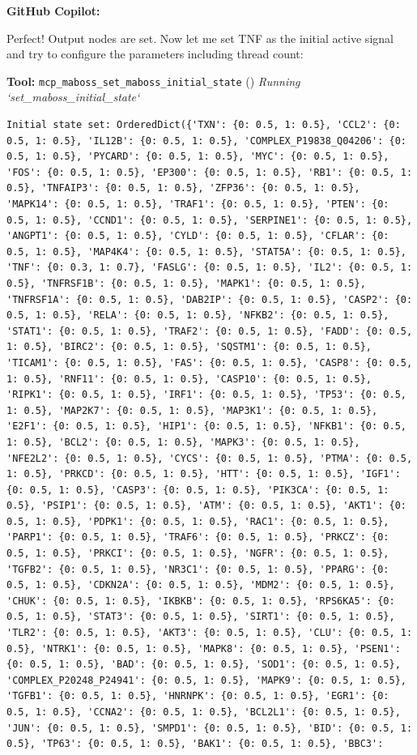 \documentclass[11pt,a4paper]{article}
\begin{document}
\begin{copilotbox}
\textbf{GitHub Copilot:}

Perfect! Output nodes are set. Now let me set TNF as the initial active signal and try to configure the parameters including thread count:

\end{copilotbox}
\begin{toolokbox}
\textbf{Tool:} \texttt{mcp\_maboss\_set\_maboss\_initial\_state} (\checkmark)
\textit{Running `set\_maboss\_initial\_state`}
\begin{lstlisting}
Initial state set: OrderedDict({'TXN': {0: 0.5, 1: 0.5}, 'CCL2': {0: 0.5, 1: 0.5}, 'IL12B': {0: 0.5, 1: 0.5}, 'COMPLEX_P19838_Q04206': {0: 0.5, 1: 0.5}, 'PYCARD': {0: 0.5, 1: 0.5}, 'MYC': {0: 0.5, 1: 0.5}, 'FOS': {0: 0.5, 1: 0.5}, 'EP300': {0: 0.5, 1: 0.5}, 'RB1': {0: 0.5, 1: 0.5}, 'TNFAIP3': {0: 0.5, 1: 0.5}, 'ZFP36': {0: 0.5, 1: 0.5}, 'MAPK14': {0: 0.5, 1: 0.5}, 'TRAF1': {0: 0.5, 1: 0.5}, 'PTEN': {0: 0.5, 1: 0.5}, 'CCND1': {0: 0.5, 1: 0.5}, 'SERPINE1': {0: 0.5, 1: 0.5}, 'ANGPT1': {0: 0.5, 1: 0.5}, 'CYLD': {0: 0.5, 1: 0.5}, 'CFLAR': {0: 0.5, 1: 0.5}, 'MAP4K4': {0: 0.5, 1: 0.5}, 'STAT5A': {0: 0.5, 1: 0.5}, 'TNF': {0: 0.3, 1: 0.7}, 'FASLG': {0: 0.5, 1: 0.5}, 'IL2': {0: 0.5, 1: 0.5}, 'TNFRSF1B': {0: 0.5, 1: 0.5}, 'MAPK1': {0: 0.5, 1: 0.5}, 'TNFRSF1A': {0: 0.5, 1: 0.5}, 'DAB2IP': {0: 0.5, 1: 0.5}, 'CASP2': {0: 0.5, 1: 0.5}, 'RELA': {0: 0.5, 1: 0.5}, 'NFKB2': {0: 0.5, 1: 0.5}, 'STAT1': {0: 0.5, 1: 0.5}, 'TRAF2': {0: 0.5, 1: 0.5}, 'FADD': {0: 0.5, 1: 0.5}, 'BIRC2': {0: 0.5, 1: 0.5}, 'SQSTM1': {0: 0.5, 1: 0.5}, 'TICAM1': {0: 0.5, 1: 0.5}, 'FAS': {0: 0.5, 1: 0.5}, 'CASP8': {0: 0.5, 1: 0.5}, 'RNF11': {0: 0.5, 1: 0.5}, 'CASP10': {0: 0.5, 1: 0.5}, 'RIPK1': {0: 0.5, 1: 0.5}, 'IRF1': {0: 0.5, 1: 0.5}, 'TP53': {0: 0.5, 1: 0.5}, 'MAP2K7': {0: 0.5, 1: 0.5}, 'MAP3K1': {0: 0.5, 1: 0.5}, 'E2F1': {0: 0.5, 1: 0.5}, 'HIP1': {0: 0.5, 1: 0.5}, 'NFKB1': {0: 0.5, 1: 0.5}, 'BCL2': {0: 0.5, 1: 0.5}, 'MAPK3': {0: 0.5, 1: 0.5}, 'NFE2L2': {0: 0.5, 1: 0.5}, 'CYCS': {0: 0.5, 1: 0.5}, 'PTMA': {0: 0.5, 1: 0.5}, 'PRKCD': {0: 0.5, 1: 0.5}, 'HTT': {0: 0.5, 1: 0.5}, 'IGF1': {0: 0.5, 1: 0.5}, 'CASP3': {0: 0.5, 1: 0.5}, 'PIK3CA': {0: 0.5, 1: 0.5}, 'PSIP1': {0: 0.5, 1: 0.5}, 'ATM': {0: 0.5, 1: 0.5}, 'AKT1': {0: 0.5, 1: 0.5}, 'PDPK1': {0: 0.5, 1: 0.5}, 'RAC1': {0: 0.5, 1: 0.5}, 'PARP1': {0: 0.5, 1: 0.5}, 'TRAF6': {0: 0.5, 1: 0.5}, 'PRKCZ': {0: 0.5, 1: 0.5}, 'PRKCI': {0: 0.5, 1: 0.5}, 'NGFR': {0: 0.5, 1: 0.5}, 'TGFB2': {0: 0.5, 1: 0.5}, 'NR3C1': {0: 0.5, 1: 0.5}, 'PPARG': {0: 0.5, 1: 0.5}, 'CDKN2A': {0: 0.5, 1: 0.5}, 'MDM2': {0: 0.5, 1: 0.5}, 'CHUK': {0: 0.5, 1: 0.5}, 'IKBKB': {0: 0.5, 1: 0.5}, 'RPS6KA5': {0: 0.5, 1: 0.5}, 'STAT3': {0: 0.5, 1: 0.5}, 'SIRT1': {0: 0.5, 1: 0.5}, 'TLR2': {0: 0.5, 1: 0.5}, 'AKT3': {0: 0.5, 1: 0.5}, 'CLU': {0: 0.5, 1: 0.5}, 'NTRK1': {0: 0.5, 1: 0.5}, 'MAPK8': {0: 0.5, 1: 0.5}, 'PSEN1': {0: 0.5, 1: 0.5}, 'BAD': {0: 0.5, 1: 0.5}, 'SOD1': {0: 0.5, 1: 0.5}, 'COMPLEX_P20248_P24941': {0: 0.5, 1: 0.5}, 'MAPK9': {0: 0.5, 1: 0.5}, 'TGFB1': {0: 0.5, 1: 0.5}, 'HNRNPK': {0: 0.5, 1: 0.5}, 'EGR1': {0: 0.5, 1: 0.5}, 'CCNA2': {0: 0.5, 1: 0.5}, 'BCL2L1': {0: 0.5, 1: 0.5}, 'JUN': {0: 0.5, 1: 0.5}, 'SMPD1': {0: 0.5, 1: 0.5}, 'BID': {0: 0.5, 1: 0.5}, 'TP63': {0: 0.5, 1: 0.5}, 'BAK1': {0: 0.5, 1: 0.5}, 'BBC3': 
\end{lstlisting}
\end{toolokbox}
\end{document}
